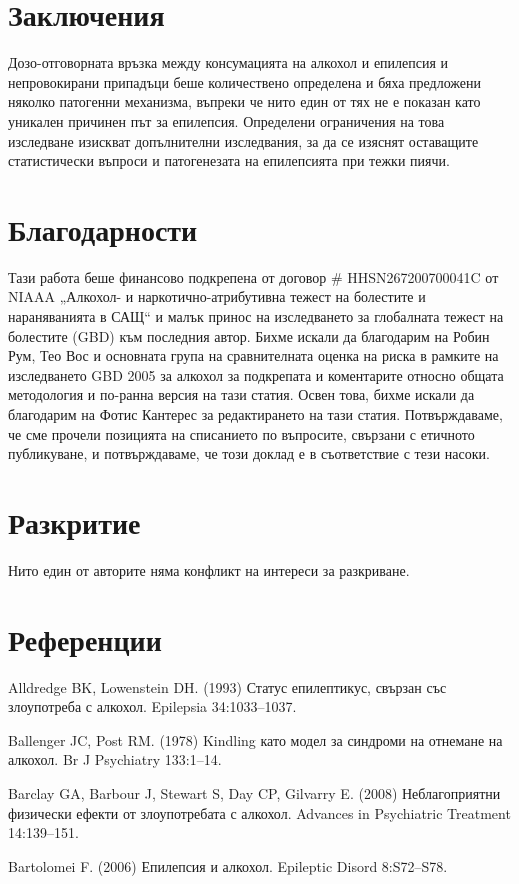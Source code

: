 \documentclass{article}
\begin{document}
\section{Заключения}
Дозо-отговорната връзка между консумацията на алкохол и епилепсия и непровокирани припадъци беше количествено определена и бяха предложени няколко патогенни механизма, въпреки че нито един от тях не е показан като уникален причинен път за епилепсия. Определени ограничения на това изследване изискват допълнителни изследвания, за да се изяснят оставащите статистически въпроси и патогенезата на епилепсията при тежки пиячи.

\section{Благодарности}
Тази работа беше финансово подкрепена от договор \# HHSN267200700041C от NIAAA „Алкохол- и наркотично-атрибутивна тежест на болестите и нараняванията в САЩ“ и малък принос на изследването за глобалната тежест на болестите (GBD) към последния автор. Бихме искали да благодарим на Робин Рум, Тео Вос и основната група на сравнителната оценка на риска в рамките на изследването GBD 2005 за алкохол за подкрепата и коментарите относно общата методология и по-ранна версия на тази статия. Освен това, бихме искали да благодарим на Фотис Кантерес за редактирането на тази статия. Потвърждаваме, че сме прочели позицията на списанието по въпросите, свързани с етичното публикуване, и потвърждаваме, че този доклад е в съответствие с тези насоки.

\section{Разкритие}
Нито един от авторите няма конфликт на интереси за разкриване.


\section{Референции}
Alldredge BK, Lowenstein DH. (1993) Статус епилептикус, свързан със злоупотреба с алкохол. Epilepsia 34:1033–1037.

Ballenger JC, Post RM. (1978) Kindling като модел за синдроми на отнемане на алкохол. Br J Psychiatry 133:1–14.

Barclay GA, Barbour J, Stewart S, Day CP, Gilvarry E. (2008) Неблагоприятни физически ефекти от злоупотребата с алкохол. Advances in Psychiatric Treatment 14:139–151.

Bartolomei F. (2006) Епилепсия и алкохол. Epileptic Disord 8:S72–S78.
\end{document}
